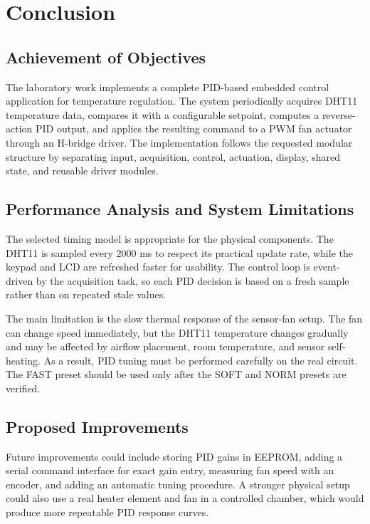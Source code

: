 \section{Conclusion}

\subsection{Achievement of Objectives}

The laboratory work implements a complete PID-based embedded control application for temperature regulation. The system periodically acquires DHT11 temperature data, compares it with a configurable setpoint, computes a reverse-action PID output, and applies the resulting command to a PWM fan actuator through an H-bridge driver. The implementation follows the requested modular structure by separating input, acquisition, control, actuation, display, shared state, and reusable driver modules.

\subsection{Performance Analysis and System Limitations}

The selected timing model is appropriate for the physical components. The DHT11 is sampled every 2000 ms to respect its practical update rate, while the keypad and LCD are refreshed faster for usability. The control loop is event-driven by the acquisition task, so each PID decision is based on a fresh sample rather than on repeated stale values.

The main limitation is the slow thermal response of the sensor-fan setup. The fan can change speed immediately, but the DHT11 temperature changes gradually and may be affected by airflow placement, room temperature, and sensor self-heating. As a result, PID tuning must be performed carefully on the real circuit. The FAST preset should be used only after the SOFT and NORM presets are verified.

\subsection{Proposed Improvements}

Future improvements could include storing PID gains in EEPROM, adding a serial command interface for exact gain entry, measuring fan speed with an encoder, and adding an automatic tuning procedure. A stronger physical setup could also use a real heater element and fan in a controlled chamber, which would produce more repeatable PID response curves.

